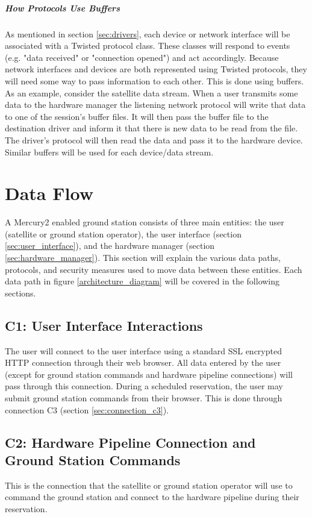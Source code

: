 \documentclass{mxl-design}
\begin{document}
\subparagraph{How Protocols Use Buffers}
As mentioned in section \ref{sec:drivers}, each device or network interface will be associated with a Twisted protocol class. These classes will respond to events (e.g. "data received" or "connection opened") and act accordingly. Because network interfaces and devices are both represented using Twisted protocols, they will need some way to pass information to each other. This is done using buffers. As an example, consider the satellite data stream. When a user transmits some data to the hardware manager the listening network protocol will write that data to one of the session's buffer files. It will then pass the buffer file to the destination driver and inform it that there is new data to be read from the file. The driver's protocol will then read the data and pass it to the hardware device. Similar buffers will be used for each device/data stream.

\section{Data Flow}
\label{sec:data_flow}
A Mercury2 enabled ground station consists of three main entities: the user (satellite or ground station operator), the user interface (section \ref{sec:user_interface}), and the hardware manager (section \ref{sec:hardware_manager}). This section will explain the various data paths, protocols, and security measures used to move data between these entities. Each data path in figure \ref{architecture_diagram} will be covered in the following sections.

\subsection{C1: User Interface Interactions}
\label{sec:connection_c1}
The user will connect to the user interface using a standard SSL encrypted HTTP connection through their web browser. All data entered by the user (except for ground station commands and hardware pipeline connections) will pass through this connection. During a scheduled reservation, the user may submit ground station commands from their browser. This is done through connection C3 (section \ref{sec:connection_c3}).

\subsection{C2: Hardware Pipeline Connection and Ground Station Commands}
\label{sec:connection_c2}
This is the connection that the satellite or ground station operator will use to command the ground station and connect to the hardware pipeline during their reservation.
\end{document}
